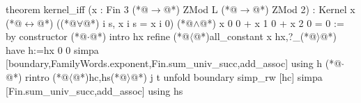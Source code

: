 theorem kernel_iff (x : Fin 3 (*@$\to$@*) ZMod L (*@$\to$@*) ZMod 2) : Kernel x (*@$\leftrightarrow$@*)
    ((*@$\forall$@*) i s, x i s = x i 0) (*@$\land$@*) x 0 0 + x 1 0 + x 2 0 = 0 := by
  constructor
  (*@$\cdot$@*) intro hx
    refine (*@$\langle$@*)all_constant x hx,?_(*@$\rangle$@*)
    have h:=hx 0 0
    simpa [boundary,FamilyWords.exponent,Fin.sum_univ_succ,add_assoc] using h
  (*@$\cdot$@*) rintro (*@$\langle$@*)hc,hs(*@$\rangle$@*) j t
    unfold boundary
    simp_rw [hc]
    simpa [Fin.sum_univ_succ,add_assoc] using hs
